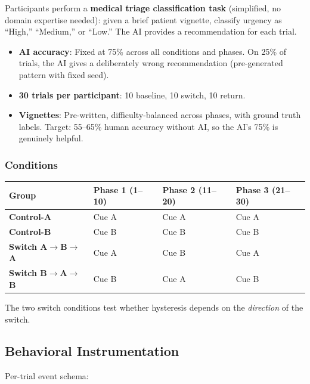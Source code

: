 \documentclass[12pt]{article}
\begin{document}
Participants perform a \textbf{medical triage classification task} (simplified, no domain expertise needed): given a brief patient vignette, classify urgency as ``High,'' ``Medium,'' or ``Low.'' The AI provides a recommendation for each trial.

\begin{itemize}
\item \textbf{AI accuracy}: Fixed at 75\% across all conditions and phases. On 25\% of trials, the AI gives a deliberately wrong recommendation (pre-generated pattern with fixed seed).
\item \textbf{30 trials per participant}: 10 baseline, 10 switch, 10 return.
\item \textbf{Vignettes}: Pre-written, difficulty-balanced across phases, with ground truth labels. Target: 55--65\% human accuracy without AI, so the AI's 75\% is genuinely helpful.
\end{itemize}

\subsubsection{Conditions}

\begin{table}[H]
\centering
\begin{tabular}{llll}
\toprule
Group & Phase 1 (1--10) & Phase 2 (11--20) & Phase 3 (21--30) \\
\midrule
\textbf{Control-A} & Cue A & Cue A & Cue A \\
\textbf{Control-B} & Cue B & Cue B & Cue B \\
\textbf{Switch A$\to$B$\to$A} & Cue A & Cue B & Cue A \\
\textbf{Switch B$\to$A$\to$B} & Cue B & Cue A & Cue B \\
\bottomrule
\end{tabular}
\end{table}

The two switch conditions test whether hysteresis depends on the \emph{direction} of the switch.

\subsection{Behavioral Instrumentation}

Per-trial event schema:
\end{document}
